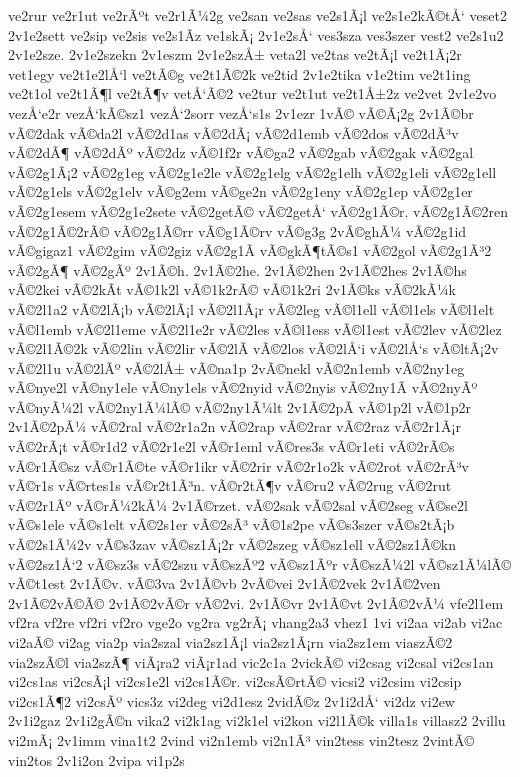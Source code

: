 {ve2rur
ve2r1ut
ve2rÃºt
ve2r1Ã¼2g
ve2san
ve2sas
ve2s1Ã¡l
ve2s1e2kÃ©tÅ‘
veset2
2v1e2sett
ve2sip
ve2sis
ve2s1Ã­z
ve1skÃ¡
2v1e2sÅ‘
ves3sza
ves3szer
vest2
ve2s1u2
2v1e2sze.
2v1e2szekn
2v1eszm
2v1e2szÅ±
veta2l
ve2tas
ve2tÃ¡l
ve2t1Ã¡2r
vet1egy
ve2t1e2lÅ‘l
ve2tÃ©g
ve2t1Ã©2k
ve2tid
2v1e2tika
v1e2tim
ve2t1ing
ve2t1ol
ve2t1Ã¶l
ve2tÃ¶v
vetÅ‘Ã©2
ve2tur
ve2t1ut
ve2t1Å±2z
ve2vet
2v1e2vo
vezÅ‘e2r
vezÅ‘kÃ©sz1
vezÅ‘2sorr
vezÅ‘s1s
2v1ezr
1vÃ©
vÃ©Ã¡2g
2v1Ã©br
vÃ©2dak
vÃ©da2l
vÃ©2d1as
vÃ©2dÃ¡
vÃ©2d1emb
vÃ©2dos
vÃ©2dÃ³v
vÃ©2dÃ¶
vÃ©2dÃº
vÃ©2dz
vÃ©1f2r
vÃ©ga2
vÃ©2gab
vÃ©2gak
vÃ©2gal
vÃ©2g1Ã¡2
vÃ©2g1eg
vÃ©2g1e2le
vÃ©2g1elg
vÃ©2g1elh
vÃ©2g1eli
vÃ©2g1ell
vÃ©2g1els
vÃ©2g1elv
vÃ©g2em
vÃ©ge2n
vÃ©2g1eny
vÃ©2g1ep
vÃ©2g1er
vÃ©2g1esem
vÃ©2g1e2sete
vÃ©2getÃ©
vÃ©2getÅ‘
vÃ©2g1Ã©r.
vÃ©2g1Ã©2ren
vÃ©2g1Ã©2rÃ©
vÃ©2g1Ã©rr
vÃ©g1Ã©rv
vÃ©g3g
2vÃ©ghÃ¼
vÃ©2g1id
vÃ©gigaz1
vÃ©2gim
vÃ©2giz
vÃ©2g1Ã­
vÃ©gkÃ¶tÃ©s1
vÃ©2gol
vÃ©2g1Ã³2
vÃ©2gÃ¶
vÃ©2gÃº
2v1Ã©h.
2v1Ã©2he.
2v1Ã©2hen
2v1Ã©2hes
2v1Ã©hs
vÃ©2kei
vÃ©2kÃ­t
vÃ©1k2l
vÃ©1k2rÃ©
vÃ©1k2ri
2v1Ã©ks
vÃ©2kÃ¼k
vÃ©2l1a2
vÃ©2lÃ¡b
vÃ©2lÃ¡l
vÃ©2l1Ã¡r
vÃ©2leg
vÃ©l1ell
vÃ©l1els
vÃ©l1elt
vÃ©l1emb
vÃ©2l1eme
vÃ©2l1e2r
vÃ©2les
vÃ©l1ess
vÃ©l1est
vÃ©2lev
vÃ©2lez
vÃ©2l1Ã©2k
vÃ©2lin
vÃ©2lir
vÃ©2lÃ­
vÃ©2los
vÃ©2lÅ‘i
vÃ©2lÅ‘s
vÃ©ltÃ¡2v
vÃ©2l1u
vÃ©2lÃº
vÃ©2lÅ±
vÃ©na1p
2vÃ©nekl
vÃ©2n1emb
vÃ©2ny1eg
vÃ©nye2l
vÃ©ny1ele
vÃ©ny1els
vÃ©2nyid
vÃ©2nyis
vÃ©2ny1Ã­
vÃ©2nyÃº
vÃ©nyÃ¼2l
vÃ©2ny1Ã¼lÃ©
vÃ©2ny1Ã¼lt
2v1Ã©2pÃ­
vÃ©1p2l
vÃ©1p2r
2v1Ã©2pÃ¼
vÃ©2ral
vÃ©2r1a2n
vÃ©2rap
vÃ©2rar
vÃ©2raz
vÃ©2r1Ã¡r
vÃ©2rÃ¡t
vÃ©r1d2
vÃ©2r1e2l
vÃ©r1eml
vÃ©res3s
vÃ©r1eti
vÃ©2rÃ©s
vÃ©r1Ã©sz
vÃ©r1Ã©te
vÃ©r1ikr
vÃ©2rir
vÃ©2r1o2k
vÃ©2rot
vÃ©2rÃ³v
vÃ©r1s
vÃ©rtes1s
vÃ©r2t1Ã³n.
vÃ©r2tÃ¶v
vÃ©ru2
vÃ©2rug
vÃ©2rut
vÃ©2r1Ãº
vÃ©rÃ¼2kÃ¼
2v1Ã©rzet.
vÃ©2sak
vÃ©2sal
vÃ©2seg
vÃ©se2l
vÃ©s1ele
vÃ©s1elt
vÃ©2s1er
vÃ©2sÃ³
vÃ©1s2pe
vÃ©s3szer
vÃ©s2tÃ¡b
vÃ©2s1Ã¼2v
vÃ©s3zav
vÃ©sz1Ã¡2r
vÃ©2szeg
vÃ©sz1ell
vÃ©2sz1Ã©kn
vÃ©2sz1Å‘2
vÃ©sz3s
vÃ©2szu
vÃ©szÃº2
vÃ©sz1Ãºr
vÃ©szÃ¼2l
vÃ©sz1Ã¼lÃ©
vÃ©t1est
2v1Ã©v.
vÃ©3va
2v1Ã©vb
2vÃ©vei
2v1Ã©2vek
2v1Ã©2ven
2v1Ã©2vÃ©Ã©
2v1Ã©2vÃ©r
vÃ©2vi.
2v1Ã©vr
2v1Ã©vt
2v1Ã©2vÃ¼
vfe2l1em
vf2ra
vf2re
vf2ri
vf2ro
vge2o
vg2ra
vg2rÃ¡
vhang2a3
vhez1
1vi
vi2aa
vi2ab
vi2ac
vi2aÃ©
vi2ag
via2p
via2szal
via2sz1Ã¡l
via2sz1Ã¡rn
via2sz1em
viaszÃ©2
via2szÃ©l
via2szÃ¶
viÃ¡ra2
viÃ¡r1ad
vic2c1a
2vickÃ©
vi2csag
vi2csal
vi2cs1an
vi2cs1as
vi2csÃ¡l
vi2cs1e2l
vi2cs1Ã©r.
vi2csÃ©rtÃ©
vicsi2
vi2csim
vi2csip
vi2cs1Ã¶2
vi2csÃº
vics3z
vi2deg
vi2d1esz
2vidÃ©z
2v1i2dÅ‘
vi2dz
vi2ew
2v1i2gaz
2v1i2gÃ©n
vika2
vi2k1ag
vi2k1el
vi2kon
vi2l1Ã©k
villa1s
villasz2
2villu
vi2mÃ¡
2v1imm
vina1t2
2vind
vi2n1emb
vi2n1Ã³
vin2tess
vin2tesz
2vintÃ©
vin2tos
2v1i2on
2vipa
vi1p2s
}
